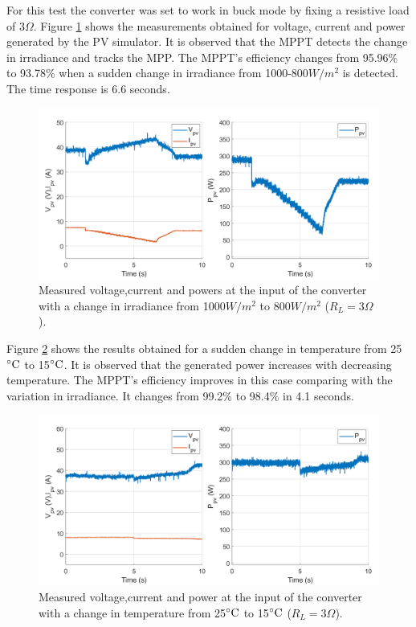 For this test the converter was set to work in buck mode by fixing a resistive load of 3$\Omega$. Figure \ref{MPPTtestbuckmodeir} shows the measurements obtained for voltage, current and power generated by the PV simulator. It is observed that the MPPT detects the change in irradiance and tracks the MPP. The MPPT's efficiency changes from 95.96\% to 93.78\% when a sudden change in irradiance from 1000-800$W/m^2$ is detected. The time response is 6.6 seconds.

\begin{figure}[H]
	\begin{center}
		\includegraphics[width=1\textwidth]{../Pictures/P1/Test/Buck_mode_MPPT_Vin_Iin_Pin_irriadance_change}
		\caption{Measured voltage,current and powers at the input of the converter with a change in irradiance from 1000$W/m^2$ to 800$W/m^2$ ($R_{L}=3\Omega$).}
		\label{MPPTtestbuckmodeir}
	\end{center}	
\end{figure}

Figure \ref{MPPTtestbuckmodet} shows the results obtained for a sudden change in temperature from 25$\decC$ to 15$\decC$. It is observed that the generated power increases with decreasing temperature. The MPPT's efficiency improves in this case comparing with the variation in irradiance. It changes from 99.2\% to 98.4\% in 4.1 seconds. 

\begin{figure}[H]
	\begin{center}
		\includegraphics[width=1\textwidth]{../Pictures/P1/Test/Buck_mode_MPPT_Vin_Iin_Pin_temperature_change}
		\caption{Measured voltage,current and power at the input of the converter with a change in temperature from 25$\decC$ to 15$\decC$ ($R_{L}=3\Omega$).}
		\label{MPPTtestbuckmodet}
	\end{center}	
\end{figure}